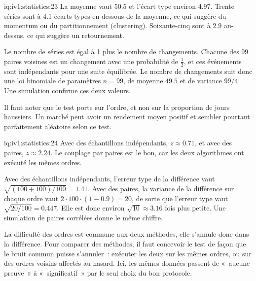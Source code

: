 \begin{solution}{iq:iv1:statistics:23}
La moyenne vaut $50.5$ et l'écart type environ $4.97$. Trente séries sont à $4.1$ écarts types en dessous de la moyenne, ce qui suggère du momentum ou du partitionnement (clustering). Soixante-cinq sont à $2.9$ au-dessus, ce qui suggère un retournement.

Le nombre de séries est égal à 1 plus le nombre de changements. Chacune des 99 paires voisines est un changement avec une probabilité de $\tfrac12$, et ces événements sont indépendants pour une suite équilibrée. Le nombre de changements suit donc une loi binomiale de paramètres $n = 99$, de moyenne $49.5$ et de variance $99/4$. Une simulation confirme ces deux valeurs.

Il faut noter que le test porte sur l'ordre, et non sur la proportion de jours haussiers. Un marché peut avoir un rendement moyen positif et sembler pourtant parfaitement aléatoire selon ce test.

\end{solution}

\begin{solution}{iq:iv1:statistics:24}
Avec des échantillons indépendants, $z \approx 0.71$, et avec des paires, $z \approx 2.24$. Le couplage par paires est le bon, car les deux algorithmes ont exécuté les mêmes ordres.

Avec des échantillons indépendants, l'erreur type de la différence vaut $\sqrt{(100 + 100)/100} = 1.41$. Avec des paires, la variance de la différence sur chaque ordre vaut $2 \cdot 100 \cdot (1 - 0.9) = 20$, de sorte que l'erreur type vaut $\sqrt{20/100} = 0.447$. Elle est donc environ $\sqrt{10} \approx 3.16$ fois plus petite. Une simulation de paires corrélées donne le même chiffre.

La difficulté des ordres est commune aux deux méthodes, elle s'annule donc dans la différence. Pour comparer des méthodes, il faut concevoir le test de façon que le bruit commun puisse s'annuler~: exécuter les deux sur les mêmes ordres, ou sur des ordres voisins affectés au hasard. Ici, les mêmes données passent de «~aucune preuve~» à «~significatif~» par le seul choix du bon protocole.

\end{solution}

